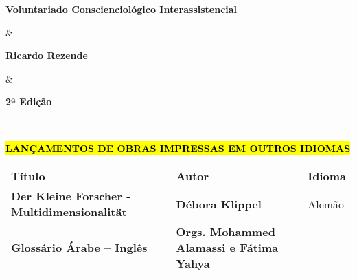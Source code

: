 \documentclass[
]{article}
\begin{document}
\begin{longtable}[]
\begin{minipage}[b]{\linewidth}\raggedright
\textbf{Voluntariado Conscienciológico Interassistencial}
\end{minipage} & \begin{minipage}[b]{\linewidth}\raggedright
\textbf{Ricardo Rezende}
\end{minipage} & \begin{minipage}[b]{\linewidth}\raggedright
\textbf{2ª Edição}
\end{minipage} \\
\midrule\noalign{}
\endhead
\bottomrule\noalign{}
\endlastfoot
\end{longtable}

\textbf{\hl{LANÇAMENTOS DE OBRAS IMPRESSAS EM OUTROS IDIOMAS}}

\begin{longtable}[]{@{}
  >{\raggedright\arraybackslash}p{}
  >{\raggedright\arraybackslash}p{}
  >{\raggedright\arraybackslash}p{}@{}}
\toprule\noalign{}
\begin{minipage}[b]{\linewidth}\centering
\textbf{Título}
\end{minipage} & \begin{minipage}[b]{\linewidth}\centering
\textbf{Autor}
\end{minipage} & \begin{minipage}[b]{\linewidth}\centering
\textbf{Idioma}
\end{minipage} \\
\begin{minipage}[b]{\linewidth}\raggedright
\textbf{Der Kleine Forscher - Multidimensionalität}
\end{minipage} & \begin{minipage}[b]{\linewidth}\raggedright
\textbf{Débora Klippel}
\end{minipage} & \begin{minipage}[b]{\linewidth}\raggedright
Alemão
\end{minipage} \\
\begin{minipage}[b]{\linewidth}\raggedright
\textbf{Glossário Árabe -- Inglês}
\end{minipage} & \begin{minipage}[b]{\linewidth}\raggedright
\textbf{Orgs. Mohammed Alamassi e Fátima Yahya}
\end{minipage} & \begin{minipage}[b]{\linewidth}\raggedright

\end{minipage}
\end{longtable}
\end{document}

